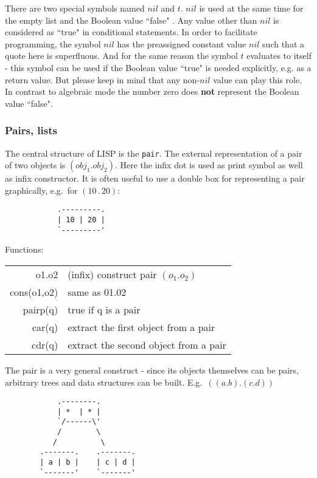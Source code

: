 There are two special symbols named $nil$ and $t$. $nil$ is
used at the same time for the empty list and the Boolean
value ``false"   . 
Any value other than $nil$ is considered as
``true" in conditional statements. In order to facilitate programming,
the symbol $nil$ has the preassigned constant value $nil$ such
that a quote here is superfluous. And for the same reason
the symbol $t$ evaluates to itself
 - this symbol can be used if the Boolean value ``true"
is needed explicitly, e.g. as a return value. But please keep
in mind that any non-$nil$ value can play this role. In contrast to
algebraic mode the number zero does {\bf not} represent the
Boolean value ``false".

\subsubsection{Pairs, lists}

The central structure of LISP is the {\tt pair}.
The external representation of a pair of two objects
is $( obj_1 . obj_2)$.  Here the infix dot is used
as print symbol as well as infix constructor.  
It is often useful to use a double box for
representing a pair graphically, e.g.\  for $(10\, . \,20)$:
{\nopagebreak[3]
\begin{verbatim}
            .---------.
            | 10 | 20 |
            `---------'
\end{verbatim}
}

Functions:
\begin{center}
\begin{tabular}{|r|l|} \hline
   o1.o2  & (infix) construct pair $(o_1 . o_2)$ \\
   cons(o1,o2) & same as 01.02 \\
   pairp(q) & true if q is a pair \\
   car(q)   & extract the first object from a pair \\
   cdr(q)   & extract the second object from a pair \\ \hline
\end{tabular}
\end{center}

The pair is a very general construct - since its objects themselves
can be pairs, arbitrary trees  and data structures can be
built. E.g.\  $((a . b) . (c . d))$
{\nopagebreak[3]
\begin{verbatim}
            .--------.
            | *  | * |
            `/------\'
            /        \
           /          \
        .-------.    .-------.
        | a | b |    | c | d |
        `-------'    `-------'
\end{verbatim}
}


